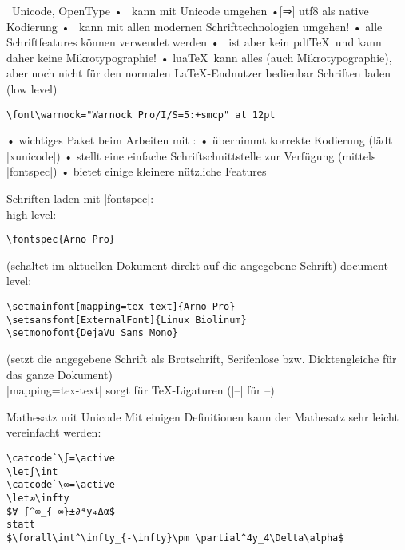\begin{frame}[fragile]{\XeTeX\, Unicode, OpenType}
• \XeTeX\ kann mit Unicode umgehen
•[⇒] utf8 als native Kodierung
• \XeTeX\ kann mit allen modernen Schrifttechnologien umgehen!
• alle Schriftfeatures können verwendet werden\pause
• \XeTeX\ ist aber \alert{kein} pdf\TeX\ und kann daher \alert{keine} Mikrotypographie!
• lua\TeX\ kann alles (auch Mikrotypographie), aber noch nicht für den normalen \LaTeX-Endnutzer bedienbar
\•
Schriften laden (\alert{low level})
\begin{lstlisting}
\font\warnock="Warnock Pro/I/S=5:+smcp" at 12pt
\end{lstlisting}
\end{frame}

\begin{frame}{}
• wichtiges Paket beim Arbeiten mit \XeLaTeX:
• übernimmt korrekte Kodierung (lädt |xunicode|)
• stellt eine einfache Schriftschnittstelle zur Verfügung (mittels |fontspec|)
• bietet einige kleinere nützliche Features
\• 
\end{frame}

\begin{frame}[fragile]{}
Schriften laden mit |fontspec|:\\
\alert{high level:}
\begin{lstlisting}
\fontspec{Arno Pro}
\end{lstlisting}
(schaltet im aktuellen Dokument direkt auf die angegebene Schrift)
\pause \alert{document level:}
\begin{lstlisting}
\setmainfont[mapping=tex-text]{Arno Pro}
\setsansfont[ExternalFont]{Linux Biolinum}
\setmonofont{DejaVu Sans Mono}
\end{lstlisting}
 (setzt die angegebene Schrift als Brotschrift, Serifenlose bzw. Dicktengleiche für das ganze Dokument)\\
|mapping=tex-text| sorgt für \TeX-Ligaturen (|--| für –)\enlargethispage{2cm}
\end{frame}

\begin{frame}[fragile]{\XeLaTeX\ + Neo}
• Schnelles, angenehmes Schreiben (allgemein)
• |\{}[]%
• Intuitiverer Umgang:
\•
\begin{tabular}[t]{l@{ statt }l}%
|–| & |--|\\
… & |\dots|\\
|„“| & |"` "'|\\
|»«| & |\flqq\frqq|\\
\end{tabular}
\\
\einschub[itemize hack in alttex]
\end{frame}

\begin{frame}[fragile]{Mathesatz mit Unicode}
Mit einigen Definitionen kann der Mathesatz sehr leicht vereinfacht werden:
\begin{verbatim}
\catcode`\∫=\active
\let∫\int
\catcode`\∞=\active
\let∞\infty
$∀ ∫^∞_{-∞}±∂⁴y₄Δα$
statt
$\forall\int^\infty_{-\infty}\pm \partial^4y_4\Delta\alpha$
\end{verbatim}
\end{frame}
